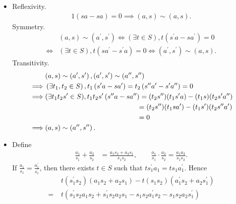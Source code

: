 \begin{solution}
    \begin{itemize}
        \item Reflexivity. 
        \begin{align*}
            1(sa-sa)=0\implies (a,s)\sim(a,s).
        \end{align*}
        Symmetry.
        \begin{align*}
            &(a, s) \sim\left(a^{\prime}, s^{\prime}\right) \Longleftrightarrow\left(\exists t \in S\right), t\left(s^{\prime} a-s a^{\prime}\right)=0 \\
            \iff&  (\exists t \in S), t\left(s a^{\prime}-s^{\prime} a\right)=0\iff \left(a^{\prime}, s^{\prime}\right)  \sim (a, s).
        \end{align*}
        Transitivity.
        \begin{align*}
            &(a, s) \sim\left(a^{\prime}, s^{\prime}\right) ,\left(a^{\prime}, s^{\prime}\right) \sim \left(a'', s''\right)\\
            \implies &\left(\exists t_1,t_2 \in S\right), t_1\left(s^{\prime} a-s a^{\prime}\right)=t_2\left(s'' a'-s' a''\right)=0  \\
            \implies & (\exists t_1t_2s' \in S), t_1t_2s'\left(s'' a-s a''\right)=(t_2s'')(t_1s'a)-(t_1s)(t_2s'a'')\\
            &\hspace{13.25em}=(t_2s'')(t_1sa')-(t_1s')(t_2s'' a')\\
            &\hspace{13.25em}=0\\
            \implies & (a, s)\sim \left(a'', s''\right) .
        \end{align*}
        \item Define
        \begin{align*}
            \frac{a_1}{s_1}+\frac{a_2}{s_2}&=\frac{a_1s_2+a_2s_1}{s_1s_2},\qquad \frac{a_1}{s_1}\cdot\frac{a_2}{s_2}=\frac{a_1a_2}{s_1s_2}.
        \end{align*}
        If $\frac{a_1}{s_1} = \frac{a_1^\prime}{s_1^\prime}$, then there exists $t\in S$ such that $ts_1^\prime a_1= ts_1 a_1^\prime$. Hence
        \begin{align*}
            &\;t(s_1^\prime s_2)(a_1s_2+a_2s_1)-t(s_1s_2)(a_1^\prime s_2+a_2s_1^\prime)\\
            =&\;t\left(s_1^\prime s_2a_1s_2+s_1^\prime s_2a_2s_1-s_1s_2a_1^\prime s_2-s_1s_2a_2s_1^\prime\right)\\

\end{align*}
\end{itemize}
\end{solution}

